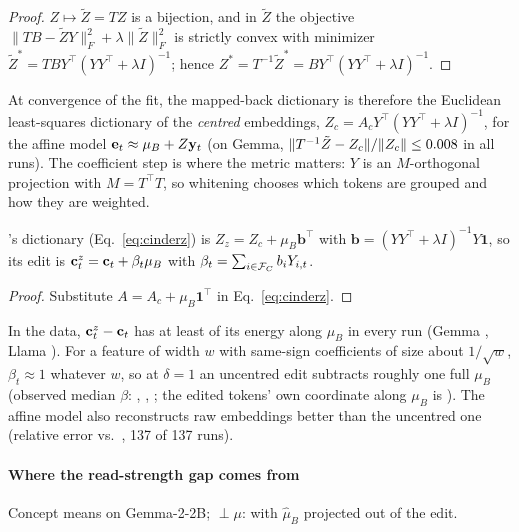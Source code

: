 \begin{proof}
$Z \mapsto \tilde Z = TZ$ is a bijection, and in $\tilde Z$ the objective $\|TB - \tilde ZY\|_F^2 + \lambda\|\tilde Z\|_F^2$ is strictly convex with minimizer $\tilde Z^* = TBY^{\top}(YY^{\top}+\lambda I)^{-1}$; hence $Z^* = T^{-1}\tilde Z^* = BY^{\top}(YY^{\top}+\lambda I)^{-1}$.
\end{proof}

\noindent At convergence of the fit, the mapped-back dictionary is therefore the Euclidean least-squares dictionary of the \emph{centred} embeddings, $Z_c = A_cY^{\top}(YY^{\top}+\lambda I)^{-1}$, for the affine model $\mathbf{e}_t \approx \mu_B + Z\mathbf y_t$ (on Gemma, $\|T^{-1}\tilde Z - Z_c\|/\|Z_c\| \le 0.008$ in all  runs).
The coefficient step is where the metric matters: $Y$ is an $M$-orthogonal projection with $M = T^{\top}T$, so whitening chooses which tokens are grouped and how they are weighted.

\begin{proposition}
\label{cor:mean}
\cinderz{}'s dictionary (Eq.~\ref{eq:cinderz}) is $Z_z = Z_c + \mu_B\mathbf b^{\top}$ with $\mathbf b = (YY^{\top}+\lambda I)^{-1}Y\mathbf 1$, so its edit is $\mathbf{c}^{z}_t = \mathbf{c}_t + \beta_t\mu_B$ with $\beta_t = \sum_{i\in\mathcal{F}_C} b_i Y_{i,t}$.
\end{proposition}

\begin{proof}
Substitute $A = A_c + \mu_B\mathbf 1^{\top}$ in Eq.~\ref{eq:cinderz}.
\end{proof}

\noindent In the data, $\mathbf{c}^z_t - \mathbf{c}_t$ has at least  of its energy along $\mu_B$ in every run (Gemma , Llama ).
For a feature of width $w$ with same-sign coefficients of size about $1/\sqrt w$, $\beta_t \approx 1$ whatever $w$, so at $\delta = 1$ an uncentred edit subtracts roughly one full $\mu_B$ (observed median $\beta$: \ember{} , \cinderz{} , \cinder{} ; the edited tokens' own coordinate along $\mu_B$ is ).
The affine model also reconstructs raw embeddings better than the uncentred one (relative error  vs.\ , 137 of 137 runs).

\paragraph{Where the read-strength gap comes from}
Concept means on Gemma-2-2B; $\perp\mu$: with $\hat\mu_B$ projected out of the edit.

